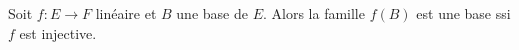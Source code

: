 Soit $f : E \to F$ linéaire et $B$  une base de $E$. Alors la famille $f(B)$ est une base ssi $f$ est injective.

\begin{reponses}
\end{reponses}

